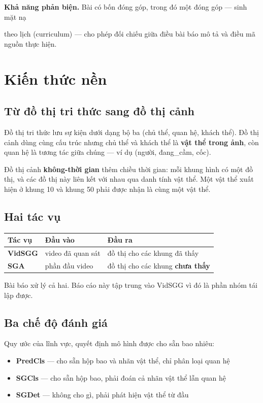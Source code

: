 \documentclass[11pt,a4paper]{article}
\newcommand{\code}[1]{{\ttfamily\small\color{codetext}#1}}
\begin{document}
\textbf{Khả năng phản biện.} Bài có bốn đóng góp, trong đó một đóng góp --- sinh mặt nạ

theo lịch (curriculum) --- cho phép đối chiếu giữa điều bài báo mô tả và điều mã nguồn thực hiện.

\section{Kiến thức nền}
\subsection{Từ đồ thị tri thức sang đồ thị cảnh}
Đồ thị tri thức lưu sự kiện dưới dạng bộ ba \code{(chủ thể, quan hệ, khách thể)}. Đồ thị cảnh dùng cùng cấu trúc nhưng chủ thể và khách thể là \textbf{vật thể trong ảnh}, còn quan hệ là tương tác giữa chúng --- ví dụ \code{(người, đang\_cầm, cốc)}.

Đồ thị cảnh \textbf{không-thời gian} thêm chiều thời gian: mỗi khung hình có một đồ thị, và các đồ thị này liên kết với nhau qua danh tính vật thể. Một vật thể xuất hiện ở khung 10 và khung 50 phải được nhận là cùng một vật thể.

\subsection{Hai tác vụ}
\begin{center}\small
\begin{tabular}{@{}lll@{}}
\toprule
\textbf{Tác vụ} & \textbf{Đầu vào} & \textbf{Đầu ra}\\
\midrule
\textbf{VidSGG} & video đã quan sát & đồ thị cho các khung đã thấy\\
\textbf{SGA} & phần đầu video & đồ thị cho các khung \textbf{chưa thấy}\\
\bottomrule
\end{tabular}
\end{center}
Bài báo xử lý cả hai. Báo cáo này tập trung vào VidSGG vì đó là phần nhóm tái lập được.

\subsection{Ba chế độ đánh giá}
Quy ước của lĩnh vực, quyết định mô hình được cho sẵn bao nhiêu:

\begin{itemize}\itemsep2pt
\item \textbf{PredCls} --- cho sẵn hộp bao và nhãn vật thể, chỉ phân loại quan hệ
\item \textbf{SGCls} --- cho sẵn hộp bao, phải đoán cả nhãn vật thể lẫn quan hệ
\item \textbf{SGDet} --- không cho gì, phải phát hiện vật thể từ đầu
\end{itemize}
\end{document}
